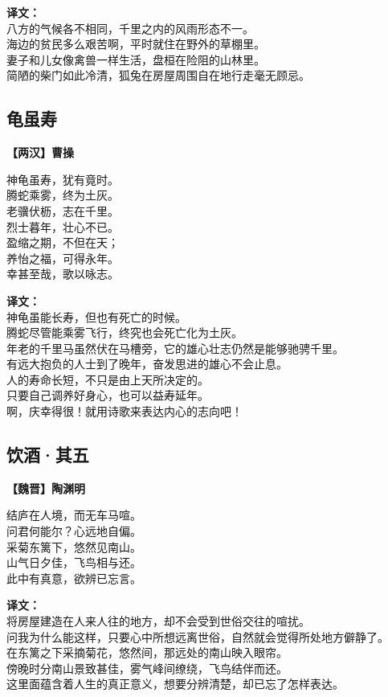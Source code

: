 \bigskip
\noindent\textbf{译文：}\\
八方的气候各不相同，千里之内的风雨形态不一。\\
海边的贫民多么艰苦啊，平时就住在野外的草棚里。\\
妻子和儿女像禽兽一样生活，盘桓在险阻的山林里。\\
简陋的柴门如此冷清，狐兔在房屋周围自在地行走毫无顾忌。


\subsection*{龟虽寿}
\textbf{【两汉】曹操}

神龟虽寿，犹有竟时。\\
腾蛇乘雾，终为土灰。\\
老骥伏枥，志在千里。\\
烈士暮年，壮心不已。\\
盈缩之期，不但在天；\\
养怡之福，可得永年。\\
幸甚至哉，歌以咏志。

\bigskip
\noindent\textbf{译文：}\\
神龟虽能长寿，但也有死亡的时候。\\
腾蛇尽管能乘雾飞行，终究也会死亡化为土灰。\\
年老的千里马虽然伏在马槽旁，它的雄心壮志仍然是能够驰骋千里。\\
有远大抱负的人士到了晚年，奋发思进的雄心不会止息。\\
人的寿命长短，不只是由上天所决定的。\\
只要自己调养好身心，也可以益寿延年。\\
啊，庆幸得很！就用诗歌来表达内心的志向吧！



\subsection*{饮酒·其五}
\textbf{【魏晋】陶渊明}

结庐在人境，而无车马喧。\\
问君何能尔？心远地自偏。\\
采菊东篱下，悠然见南山。\\
山气日夕佳，飞鸟相与还。\\
此中有真意，欲辨已忘言。

\bigskip
\noindent\textbf{译文：}\\
将房屋建造在人来人往的地方，却不会受到世俗交往的喧扰。\\
问我为什么能这样，只要心中所想远离世俗，自然就会觉得所处地方僻静了。\\
在东篱之下采摘菊花，悠然间，那远处的南山映入眼帘。\\
傍晚时分南山景致甚佳，雾气峰间缭绕，飞鸟结伴而还。\\
这里面蕴含着人生的真正意义，想要分辨清楚，却已忘了怎样表达。

